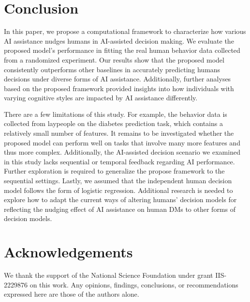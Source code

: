 \documentclass[letterpaper]{article} %
\begin{document}
\section{Conclusion}
In this paper, we propose a  computational framework to characterize how various AI assistance nudges humans in AI-assisted decision making. We evaluate the proposed model's performance in fitting the real human behavior data collected from a randomized experiment. Our results show that the proposed model consistently outperforms
other baselines in accurately predicting humans decisions under diverse forms of AI assistance.  Additionally, further analyses based on the proposed framework provided insights into how individuals with varying cognitive styles are impacted by AI assistance differently.

There are a few limitations of this study.
For example, the behavior data is collected from laypeople on the diabetes
prediction task, which contains a relatively small number of features. It remains to be investigated whether the proposed model can perform well on tasks that involve many more features and thus more complex. Additionally, the AI-assisted decision scenario we examined in this study lacks sequential or temporal feedback regarding AI performance. Further exploration is required to generalize the propose framework to the sequential settings. Lastly, we assumed that the independent human decision model follows the form of logistic regression. Additional research is needed to explore how to adapt the current ways of altering humans' decision models for reflecting the nudging effect of AI assistance on human DMs to other forms of decision models.



\section*{Acknowledgements}
We thank the support of the National Science Foundation
under grant IIS-2229876 on this work.
Any opinions, findings, conclusions, or recommendations expressed here are those of the authors alone.
\end{document}
